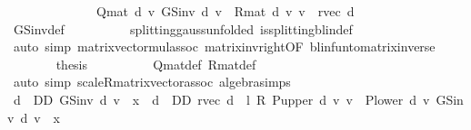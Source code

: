 \begin{isabellebody}
\ \ \ \ \isamarkupfalse%
\ {\isacharminus}{\kern0pt}\isanewline
\ \ \ \ \ \ \isamarkupfalse%
\ {\isachardoublequoteopen}Q{\isacharunderscore}{\kern0pt}mat\ d\ {\isacharasterisk}{\kern0pt}v\ {\isacharparenleft}{\kern0pt}GS{\isacharunderscore}{\kern0pt}inv\ d\ v{\isacharparenright}{\kern0pt}\ {\isacharequal}{\kern0pt}\ {\isacharparenleft}{\kern0pt}R{\isacharunderscore}{\kern0pt}mat\ d\ {\isacharasterisk}{\kern0pt}v\ v\ {\isacharplus}{\kern0pt}\ r{\isacharunderscore}{\kern0pt}vec\ d{\isacharparenright}{\kern0pt}{\isachardoublequoteclose}\isanewline
\ \ \ \ \ \ \ \ \isamarkupfalse%
\ GS{\isacharunderscore}{\kern0pt}inv{\isacharunderscore}{\kern0pt}def\isanewline
\ \ \ \ \ \ \ \ \isamarkupfalse%
\ splitting{\isacharunderscore}{\kern0pt}gauss{\isacharbrackleft}{\kern0pt}unfolded\ is{\isacharunderscore}{\kern0pt}splitting{\isacharunderscore}{\kern0pt}blin{\isacharunderscore}{\kern0pt}def{\isacharprime}{\kern0pt}{\isacharbrackright}{\kern0pt}\isanewline
\ \ \ \ \ \ \ \ \isamarkupfalse%
\ {\isacharparenleft}{\kern0pt}auto\ simp{\isacharcolon}{\kern0pt}\ matrix{\isacharunderscore}{\kern0pt}vector{\isacharunderscore}{\kern0pt}mul{\isacharunderscore}{\kern0pt}assoc\ matrix{\isacharunderscore}{\kern0pt}inv{\isacharunderscore}{\kern0pt}right{\isacharbrackleft}{\kern0pt}OF\ blinfun{\isacharunderscore}{\kern0pt}to{\isacharunderscore}{\kern0pt}matrix{\isacharunderscore}{\kern0pt}inverse{\isacharparenleft}{\kern0pt}{}{\isacharparenright}{\kern0pt}{\isacharbrackright}{\kern0pt}{\isacharparenright}{\kern0pt}\isanewline
\ \ \ \ \ \ \isamarkupfalse%
\ {\isacharquery}{\kern0pt}thesis\isanewline
\ \ \ \ \ \ \ \ \isamarkupfalse%
\ Q{\isacharunderscore}{\kern0pt}mat{\isacharunderscore}{\kern0pt}def\ R{\isacharunderscore}{\kern0pt}mat{\isacharunderscore}{\kern0pt}def\isanewline
\ \ \ \ \ \ \ \ \isamarkupfalse%
\ {\isacharparenleft}{\kern0pt}auto\ simp{\isacharcolon}{\kern0pt}\ scaleR{\isacharunderscore}{\kern0pt}matrix{\isacharunderscore}{\kern0pt}vector{\isacharunderscore}{\kern0pt}assoc\ algebra{\isacharunderscore}{\kern0pt}simps{\isacharparenright}{\kern0pt}\isanewline
\ \ \ \ \isamarkupfalse%
\isanewline
\ \ \ \ \isamarkupfalse%
\ {\isachardoublequoteopen}{\isacharparenleft}{\kern0pt}{\isasymSqunion}d\ {\isasymin}\ D\isactrlsub D{\isachardot}{\kern0pt}\ GS{\isacharunderscore}{\kern0pt}inv\ d\ v\ {\isachardollar}{\kern0pt}\ x{\isacharparenright}{\kern0pt}\ {\isacharequal}{\kern0pt}\ {\isacharparenleft}{\kern0pt}{\isasymSqunion}d\ {\isasymin}\ D\isactrlsub D{\isachardot}{\kern0pt}\ {\isacharparenleft}{\kern0pt}r{\isacharunderscore}{\kern0pt}vec\ d\ {\isacharplus}{\kern0pt}\ l\ {\isacharasterisk}{\kern0pt}\isactrlsub R\ {\isacharparenleft}{\kern0pt}P{\isacharunderscore}{\kern0pt}upper\ d\ {\isacharasterisk}{\kern0pt}v\ v\ {\isacharplus}{\kern0pt}\ P{\isacharunderscore}{\kern0pt}lower\ d\ {\isacharasterisk}{\kern0pt}v\ {\isacharparenleft}{\kern0pt}GS{\isacharunderscore}{\kern0pt}inv\ d\ v{\isacharparenright}{\kern0pt}{\isacharparenright}{\kern0pt}{\isacharparenright}{\kern0pt}\ {\isachardollar}{\kern0pt}\ x{\isacharparenright}{\kern0pt}{\isachardoublequoteclose}\isanewline

\end{isabellebody}
